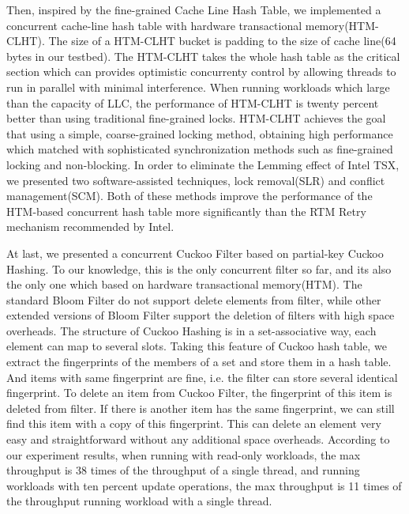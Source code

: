 \begin{enabstract}
    Then, inspired by the fine-grained Cache Line Hash Table, we implemented a concurrent cache-line hash table with hardware transactional memory(HTM-CLHT).
    The size of a HTM-CLHT bucket is padding to the size of cache line(64 bytes in our testbed). 
    The HTM-CLHT takes the whole hash table as the critical section which can provides optimistic concurrenty control by allowing threads to run in parallel with minimal interference.
    When running workloads which large than the capacity of LLC, the performance of HTM-CLHT is twenty percent better than using traditional fine-grained locks. 
    HTM-CLHT achieves the goal that using a simple, coarse-grained locking method, obtaining high performance which matched with sophisticated synchronization methods such as fine-grained locking and non-blocking.  
   In order to eliminate the Lemming effect of Intel TSX, we presented two software-assisted techniques, lock removal(SLR) and conflict management(SCM).
    Both of these methods improve the performance of the HTM-based concurrent hash table more significantly than the RTM Retry mechanism recommended by Intel.

    At last, we presented a concurrent Cuckoo Filter based on partial-key Cuckoo Hashing.
    To our knowledge, this is the only concurrent filter so far, and its also the only one which based on hardware transactional memory(HTM).
    The standard Bloom Filter do not support delete elements from filter, while other extended versions of Bloom Filter support the deletion of filters with high space overheads.
    The structure of Cuckoo Hashing is in a set-associative way, each element can map to several slots.
    Taking this feature of Cuckoo hash table, we extract the fingerprints of the members of a set and store them in a hash table. 
    And items with same fingerprint are fine, i.e. the filter can store several identical fingerprint.
    To delete an item from Cuckoo Filter, the fingerprint of this item is deleted from filter.
    If there is another item has the same fingerprint, we can still find this item with a copy of this fingerprint.
    This can delete an element very easy and straightforward without any additional space overheads.
    According to our experiment results, when running with read-only workloads, the max throughput is 38 times of the throughput of a single thread, and running workloads with ten percent update operations, the max throughput is 11 times of the throughput running workload with a single thread.

\end{enabstract}